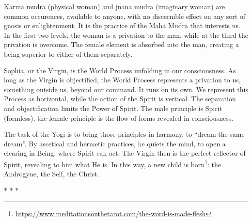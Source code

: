 Karma mudra (physical woman) and jnana mudra (imaginary woman) are common occurences, available to anyone, with no discernible effect on any sort of gnosis or enlightenment. It is the practice of the Maha Mudra that interests us. In the first two levels, the woman is a privation to the man, while at the third the privation is overcome. The female element is absorbed into the man, creating a being superior to either of them separately.

Sophia, or the Virgin, is the World Process unfolding in our consciousness. As long as the Virgin is objectified, the World Process represents a privation to us, something outside us, beyond our command. It runs on its own. We represent this Process as horizontal, while the action of the Spirit is vertical. The separation and objectification limits the Power of Spirit. The male principle is Spirit (formless), the female principle is the flow of forms revealed in consciousness.

The task of the Yogi is to bring those principles in harmony, to “dream the same dream”. By ascetical and hermetic practices, he quiets the mind, to open a clearing in Being, where Spirit can act. The Virgin then is the perfect reflector of Spirit, revealing to him what He is. In this way, a new child is born\footnote{\url{https://www.meditationsonthetarot.com/the-word-is-made-flesh}}: the Androgyne, the Self, the Christ.




\begin{center}* * *\end{center}

